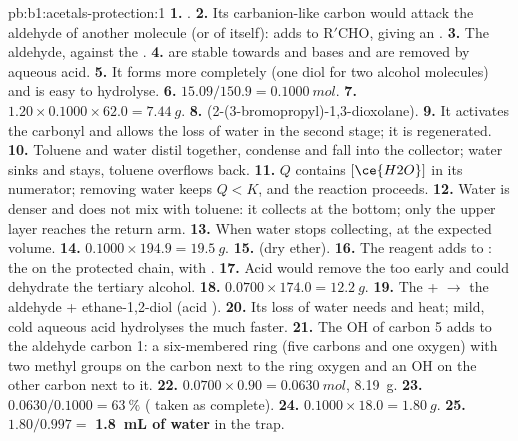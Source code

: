 \begin{solution}{pb:b1:acetals-protection:1}
\textbf{1.} .
\textbf{2.} Its carbanion-like carbon would attack the aldehyde of another
molecule (or of itself):  adds to $\mathrm{R'CHO}$, giving an .
\textbf{3.} The aldehyde, against the .
\textbf{4.}  are stable towards  and bases and are
removed by aqueous acid.
\textbf{5.} It forms more completely (one diol for two alcohol molecules)
and is easy to hydrolyse.
\textbf{6.} $15.09/150.9 = \qty{0.1000}{mol}$.
\textbf{7.} $1.20 \times 0.1000 \times 62.0 = \qty{7.44}{g}$.
\textbf{8.} 
(2-(3-bromopropyl)-1,3-dioxolane).
\textbf{9.} It activates the carbonyl and allows the loss of water in the
second stage; it is regenerated.
\textbf{10.} Toluene and water distil together, condense and fall into the
collector; water sinks and stays, toluene overflows back.
\textbf{11.} $Q$ contains $[\ce{H2O}]$ in its numerator; removing water keeps
$Q < K$, and the reaction proceeds.
\textbf{12.} Water is denser and does not mix with toluene: it collects at
the bottom; only the upper layer reaches the return arm.
\textbf{13.} When water stops collecting, at the expected volume.
\textbf{14.} $0.1000 \times 194.9 = \qty{19.5}{g}$.
\textbf{15.}  (dry ether).
\textbf{16.} The reagent adds to : the 
 on the protected chain, with .
\textbf{17.} Acid would remove the  too early and could
dehydrate the tertiary alcohol.
\textbf{18.} $0.0700 \times 174.0 = \qty{12.2}{g}$.
\textbf{19.} The  +  $\to$ the aldehyde + ethane-1,2-diol
(acid ).
\textbf{20.} Its loss of water needs  and heat; mild, cold
aqueous acid hydrolyses the  much faster.
\textbf{21.} The OH of carbon 5 adds to the aldehyde carbon 1: a six-membered
ring (five carbons and one oxygen) with two methyl groups on the carbon
next to the ring oxygen and an OH on the other carbon next to it.
\textbf{22.} $0.0700 \times 0.90 = \qty{0.0630}{mol}$, \qty{8.19}{g}.
\textbf{23.} $0.0630/0.1000 = \qty{63}{\percent}$ ( taken as
complete).
\textbf{24.} $0.1000 \times 18.0 = \qty{1.80}{g}$.
\textbf{25.} $1.80/0.997 =$ \textbf{\qty{1.8}{mL} of water} in the trap.
\end{solution}
